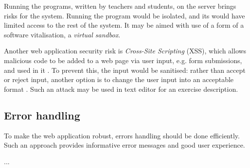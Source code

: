         Running the programs, written by teachers and students, on the server brings risks for the system. Running the program would be isolated, and its would have limited access to the rest of the system. It may be aimed with use of a form of a software vitalisation, a \textit{virtual sandbox}.
        
        Another web application security risk is \textit{Cross-Site Scripting} (XSS), which allows malicious code to be added to a web page via user input, e.g. form submissions, and used in it \cite[A7-Cross-Site Scripting (XSS)]{owasp_xss}. To prevent this, the input would be sanitised: rather than accept or reject input, another option is to change the user input into an acceptable format \cite[Sanitize]{owasp_sanitize}. Such an attack may be used in text editor for an exercise description.
        
        \subsection{Error handling}
        To make the web application robust, errors handling should be done efficiently. Such an approach provides informative error messages and good user experience.
        
        ...
